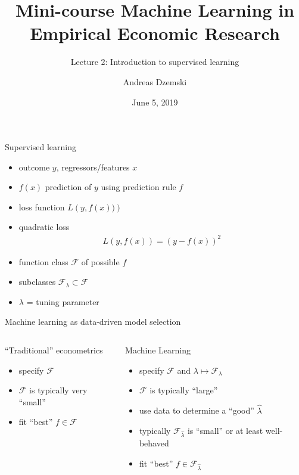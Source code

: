 \documentclass[xcolor=dvipsnames, handout]{beamer}
\author[Dzemski]{Andreas Dzemski\inst{1}}
\institute{\inst{1} University of Gothenburg}
\title{Mini-course Machine Learning in Empirical Economic Research}
\subtitle{Lecture 2: Introduction to supervised learning}
\date{June 5, 2019}
\begin{document}
\maketitle

\begin{frame}{Supervised learning}
\begin{itemize}
    \item outcome $y$, regressors/features $x$
    \pause 
    \item $f(x)$ prediction of $y$ using prediction rule $f$
    \pause 
    \item loss function $L\left(y, f(x))\right)$
    \item quadratic loss
    \begin{align*}
      L\left(y, f(x)\right) =  \left(y - f(x) \right)^2 
    \end{align*}
    \pause 
    \item function class $\mathcal{F}$ of possible $f$
    \pause
    \item subclasses $\mathcal{F}_{\lambda} \subset \mathcal{F}$
    \item $\lambda$ = tuning parameter
  \end{itemize}  
\end{frame}

\begin{frame}{Machine learning as data-driven model selection}
\begin{columns}[t, onlytextwidth]
        \begin{block}{``Traditional'' econometrics}
        \begin{itemize}
          \item<1-> 
          specify $\mathcal{F}$
          \item<2-> 
          $\mathcal{F}$ is typically very ``small''
          \item<3-> 
          fit ``best'' $f \in \mathcal{F}$
        \end{itemize}
        \end{block}
        \begin{block}{Machine Learning}
        \begin{itemize}
          \item<1-> 
          specify $\mathcal{F}$ and $\lambda \mapsto \mathcal{F}_{\lambda}$
          \item<2-> 
          $\mathcal{F}$ is typically ``large''
          \item<4-> 
          use data to determine a ``good'' $\hat{\lambda}$
          \item<4->
          typically $\mathcal{F}_{\hat{\lambda}}$ is ``small'' or at least well-behaved
          \item<4-> 
          fit ``best'' $f \in \mathcal{F}_{\hat{\lambda}}$
        \end{itemize}
      \end{block}
\end{columns}
\end{frame}
\end{document}
